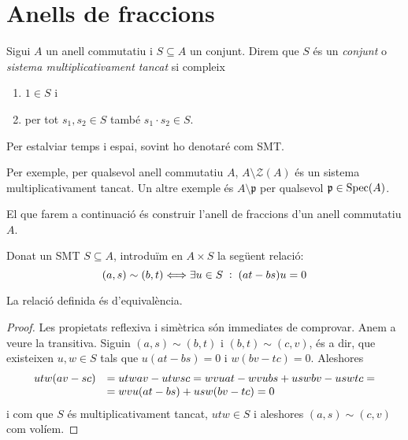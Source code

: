 \documentclass[../../../main.tex]{subfiles}
\begin{document}
\section{Anells de fraccions}

\begin{defi}
\label{def:multiplicativamentTancat} Sigui $A$ un anell commutatiu i $S\subseteq A$ un conjunt. Direm que $S$ és un \textit{conjunt} o \textit{sistema multiplicativament tancat} si compleix
\begin{enumerate}[(1)]
    \item $1\in S$ i
    \item per tot $s_1,s_2\in S$ també $s_1\cdotp s_2\in S$.
\end{enumerate}
\end{defi}

\begin{nota}
Per estalviar temps i espai, sovint ho denotaré com SMT.
\end{nota}

\begin{ej}
Per exemple, per qualsevol anell commutatiu $A$, $A\setminus\mathcal{Z}(A)$ és un sistema multiplicativament tancat. Un altre exemple és $A\setminus\mathfrak{p}$ per qualsevol $\mathfrak{p}\in \mathrm{Spec}(A)$.
\end{ej}



El que farem a continuació és construir l'anell de fraccions d'un anell commutatiu $A$.

\begin{defi}
Donat un SMT $S\subseteq A$, introduïm en $A\times S$ la següent relació:
\begin{equation}
    \notag
    (a,s)\sim (b,t)\Longleftrightarrow \exists u\in S\;:\;(at-bs)u = 0
\end{equation}
\end{defi}

\begin{prop}
La relació definida és d'equivalència.
\end{prop}
\begin{proof}
Les propietats reflexiva i simètrica són immediates de comprovar. Anem a veure la transitiva. Siguin $(a,s)\sim (b,t)$ i $(b,t)\sim (c,v)$, és a dir, que existeixen $u,w\in S$ tals que $u(at-bs) = 0$ i $w(bv-tc) = 0$. Aleshores
\begin{equation}
    \notag
    \begin{array}{rl}
        utw(av-sc) &= utwav-utwsc = wvuat-wvubs+uswbv-uswtc = \\
        & = wvu(at-bs)+usw(bv-tc) = 0
    \end{array}
\end{equation}
i com que $S$ és multiplicativament tancat, $utw\in S$ i aleshores $(a,s)\sim(c,v)$ com volíem.
\end{proof}
\end{document}

